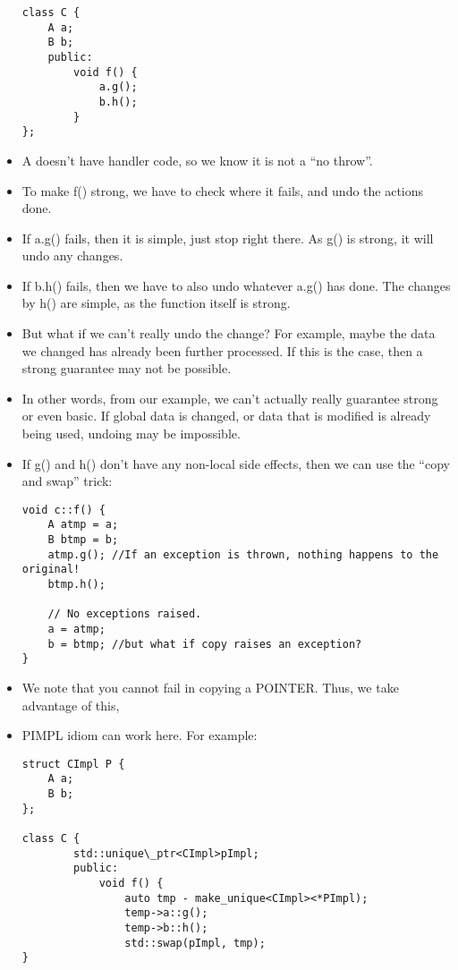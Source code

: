 \documentclass{article}
\begin{document}
\begin{itemize}
\begin{lstlisting}
class C {
    A a;
    B b;
    public:
        void f() {
            a.g();
            b.h();
        }
};
\end{lstlisting}
\item A doesn't have handler code, so we know it is not a ``no throw''.
\item To make f() strong, we have to check where it fails, and undo the actions done.
\item If a.g() fails, then it is simple, just stop right there.  As g() is strong, it will undo any changes.
\item If b.h() fails, then we have to also undo whatever a.g() has done.  The changes by h() are simple, as the function itself is strong.
\item But what if we can't really undo the change?  For example, maybe the data we changed has already been further processed.  If this is the case, then a strong guarantee may not be possible.
\item In other words, from our example, we can't actually really guarantee strong or even basic.  If global data is changed, or data that is modified is already being used, undoing may be impossible.
\item If g() and h() don't have any non-local side effects, then we can use the ``copy and swap'' trick:
\begin{lstlisting}
void c::f() {
    A atmp = a;
    B btmp = b;
    atmp.g(); //If an exception is thrown, nothing happens to the original!
    btmp.h();

    // No exceptions raised.
    a = atmp;
    b = btmp; //but what if copy raises an exception?
}
\end{lstlisting}
\item We note that you cannot fail in copying a POINTER.  Thus, we take advantage of this,
\item PIMPL idiom can work here.  For example:
\begin{lstlisting}
struct CImpl P {
    A a;
    B b;
};

class C {
        std::unique\_ptr<CImpl>pImpl;
        public:
            void f() {
                auto tmp - make_unique<CImpl><*PImpl);
                temp->a::g();
                temp->b::h();
                std::swap(pImpl, tmp);
}
\end{lstlisting}
\end{itemize}
\end{document}
